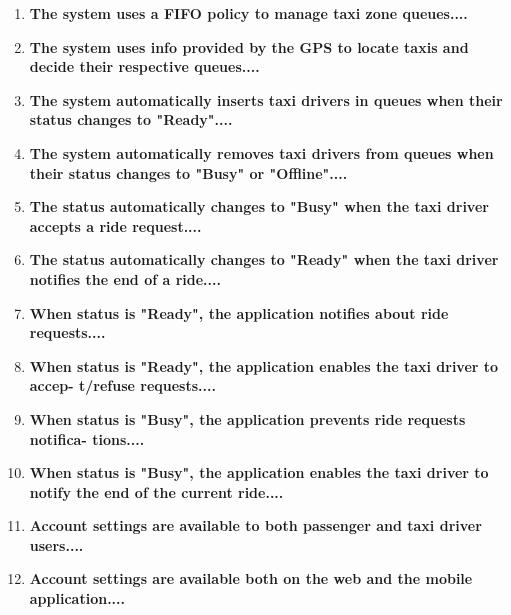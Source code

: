 \begin{enumerate}
	\item \textbf{The system uses a FIFO policy to manage taxi zone queues....}\\
	
	\item \textbf{The system uses info provided by the GPS to locate taxis and decide their
		respective queues....}\\
	
	\item \textbf{The system automatically inserts taxi drivers in queues when their status
		changes to "Ready"....}\\
	
	\item \textbf{The system automatically removes taxi drivers from queues when their
		status changes to "Busy" or "Offline"....}\\
	
	\item \textbf{The status automatically changes to "Busy" when the taxi driver accepts
		a ride request....}\\
	
	\item \textbf{The status automatically changes to "Ready" when the taxi driver notifies
		the end of a ride....}\\
	
	\item \textbf{When status is "Ready", the application notifies about ride requests....}\\
	
	\item \textbf{When status is "Ready", the application enables the taxi driver to accep-
		t/refuse requests....}\\
	
	\item \textbf{When status is "Busy", the application prevents ride requests notifica-
		tions....}\\
	
	\item \textbf{When status is "Busy", the application enables the taxi driver to notify
		the end of the current ride....}\\
	
	\item \textbf{Account settings are available to both passenger and taxi driver users....}\\
	
	\item \textbf{Account settings are available both on the web and the mobile application....}\\
	

\end{enumerate}
